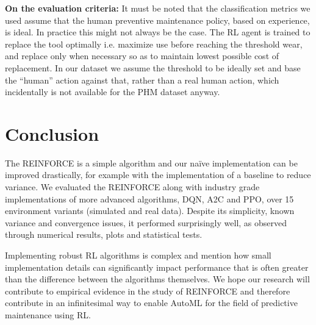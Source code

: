 \documentclass[a4paper, 12pt]{article}
\begin{document}
\textbf{On the evaluation criteria:} It must be noted that the classification metrics we used assume that the human preventive maintenance policy, based on experience, is ideal. In practice this might not always be the case. The RL agent is trained to replace the tool optimally i.e. maximize use before reaching the threshold wear, and replace only when necessary so as to maintain lowest possible cost of replacement. In our dataset we assume the threshold to be ideally set and base the ``human'' action against that, rather than a real human action, which incidentally is not available for the PHM dataset anyway.


 

\section{Conclusion}\label{sec:Conclusion}
The REINFORCE is a simple algorithm and our na\"ive implementation can be improved drastically, for example with the implementation of a baseline to reduce variance. We evaluated the REINFORCE along with industry grade implementations of more advanced algorithms, DQN, A2C and PPO, over 15 environment variants (simulated and real data). Despite its simplicity, known variance and convergence issues, it performed surprisingly well, as observed through numerical results, plots and statistical tests. 

Implementing robust RL algorithms is complex and \cite{SB3-paper} mention how small implementation details can significantly impact performance that is often greater than the difference between the algorithms themselves. We hope our research will contribute to empirical evidence in the study of REINFORCE and therefore contribute in an infinitesimal way to enable AutoML for the field of predictive maintenance using RL. %

\singlespacing


\end{document}
